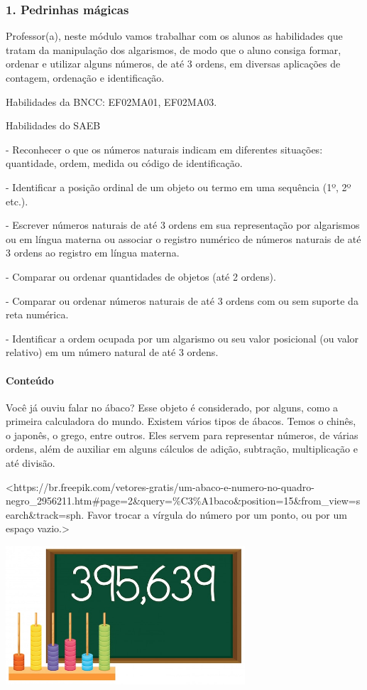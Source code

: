 \subsubsection{1. Pedrinhas
mágicas}\label{muxf3dulo-1-pedrinhas-muxe1gicas}

Professor(a), neste módulo vamos trabalhar com os alunos as habilidades
que tratam da manipulação dos algarismos, de modo que o aluno consiga
formar, ordenar e utilizar alguns números, de até 3 ordens, em diversas
aplicações de contagem, ordenação e identificação. 

Habilidades da BNCC: EF02MA01, EF02MA03.

Habilidades do SAEB

- Reconhecer o que os números naturais indicam em diferentes situações:
quantidade, ordem, medida ou código de identificação.

- Identificar a posição ordinal de um objeto ou termo em uma sequência
(1º, 2º etc.).

- Escrever números naturais de até 3 ordens em sua representação por
algarismos ou em língua materna ou associar o registro numérico de
números naturais de até 3 ordens ao registro em língua materna.

- Comparar ou ordenar quantidades de objetos (até 2 ordens).

- Comparar ou ordenar números naturais de até 3 ordens com ou sem
suporte da reta numérica.

- Identificar a ordem ocupada por um algarismo ou seu valor posicional
(ou valor relativo) em um número natural de até 3 ordens.

\paragraph{Conteúdo}\label{conteuxfado}

Você já ouviu falar no ábaco? Esse objeto é considerado, por alguns, como
a primeira calculadora do mundo. Existem vários tipos de ábacos. Temos o
chinês, o japonês, o grego, entre outros. Eles servem para representar
números, de várias ordens, além de auxiliar em alguns cálculos de
adição, subtração, multiplicação e até divisão.

\textless{}https://br.freepik.com/vetores-gratis/um-abaco-e-numero-no-quadro-negro\_2956211.htm\#page=2\&query=\%C3\%A1baco\&position=15\&from\_view=search\&track=sph.
Favor trocar a vírgula do número por um ponto, ou por um espaço
vazio.\textgreater{}

\includegraphics[width=3.51042in,height=2.03550in]{media/image1.jpeg}

